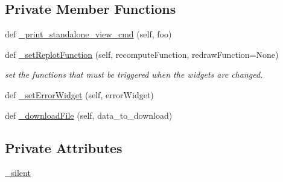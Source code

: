 \subsection*{Private Member Functions}
\begin{DoxyCompactItemize}
\item 
def \hyperlink{class_mu_mo_t_1_1_mu_mo_t_1_1_mu_mo_tcontroller_a9f047d3081e6af35b4ea932aea4fc619}{\+\_\+print\+\_\+standalone\+\_\+view\+\_\+cmd} (self, foo)
\item 
def \hyperlink{class_mu_mo_t_1_1_mu_mo_t_1_1_mu_mo_tcontroller_a4a4234d36117d729f15b9952790efdef}{\+\_\+set\+Replot\+Function} (self, recompute\+Function, redraw\+Function=None)
\begin{DoxyCompactList}\small\item\em set the functions that must be triggered when the widgets are changed. \end{DoxyCompactList}\item 
def \hyperlink{class_mu_mo_t_1_1_mu_mo_t_1_1_mu_mo_tcontroller_aef34ced86f7a9b37af011c0536798897}{\+\_\+set\+Error\+Widget} (self, error\+Widget)
\item 
def \hyperlink{class_mu_mo_t_1_1_mu_mo_t_1_1_mu_mo_tcontroller_ab703aa8fe14c83d5f12fa82d4e2c42d9}{\+\_\+download\+File} (self, data\+\_\+to\+\_\+download)
\end{DoxyCompactItemize}
\subsection*{Private Attributes}
\begin{DoxyCompactItemize}
\item 
\hyperlink{class_mu_mo_t_1_1_mu_mo_t_1_1_mu_mo_tcontroller_a909146a3c119c927727c7d533042b184}{\+\_\+silent}
\end{DoxyCompactItemize}
